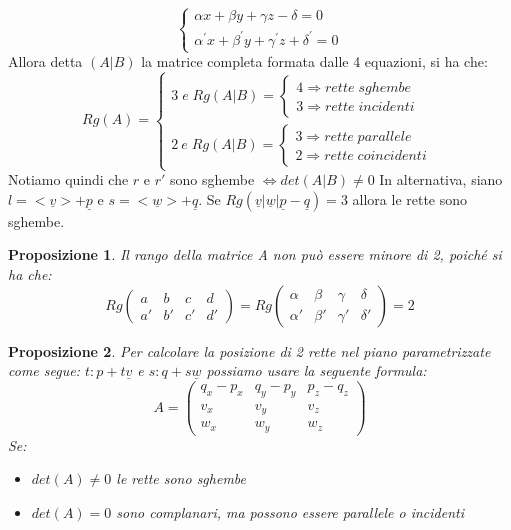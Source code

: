 \documentclass[12pt]{article}
\newenvironment{para}{\begin{adjustwidth}{13mm}{}}{\end{adjustwidth}}
\newtheorem{Proposizione}{Proposizione}[subsection]
\begin{document}
\begin{para}
$$\begin{cases}
    \alpha x+\beta y+\gamma z-\delta = 0 \\
    \alpha^{'}x+\beta^{'}y + \gamma^{'}z+ \delta^{'} = 0
\end{cases}$$
Allora detta $(A|B)$ la matrice completa formata dalle 4 equazioni, si ha che:
$$Rg(A) = \begin{cases}
    3 \; e \; Rg(A|B) = \begin{cases}
        4 \Rightarrow rette \; sghembe \\
        3 \Rightarrow rette \; incidenti
    \end{cases}\\
    2 \: e \; Rg(A|B) = \begin{cases}
        3 \Rightarrow rette \; parallele \\
        2 \Rightarrow rette \; coincidenti
    \end{cases}
\end{cases}$$
Notiamo quindi che $r$ e $r'$ sono sghembe $\Leftrightarrow det(A|B) \neq 0$
In alternativa, siano $l = <\underline{v}> + \underline{p}$ e $s = <\underline{w}> + \underline{q}$. Se $Rg(\underline{v}|\underline{w}|\underline{p}-\underline{q}) = 3$ allora le rette sono sghembe.
\begin{Proposizione}
    Il rango della matrice A non può essere minore di 2, poiché si ha che: $$Rg\begin{pmatrix}
        a & b & c & d \\
        a' & b' & c' & d'
    \end{pmatrix} = Rg\begin{pmatrix}
        \alpha & \beta & \gamma & \delta \\
        \alpha' & \beta' & \gamma' & \delta'
    \end{pmatrix} = 2$$
\end{Proposizione}
\begin{Proposizione}
    Per calcolare la posizione di 2 rette nel piano parametrizzate come segue: $t: p +t\underline{v}$ e $s: q+s\underline{w}$ possiamo usare la seguente formula: $$ A =\begin{pmatrix}
        q_x - p_x & q_y - p_y & p_z - q_z \\
        v_x & v_y & v_z \\
        w_x & w_y & w_z
    \end{pmatrix}$$
Se: \begin{itemize}
    \item $det(A) \neq 0$ le rette sono sghembe
    \item $det(A) = 0$ sono complanari, ma possono essere parallele o incidenti

\end{itemize}
\end{Proposizione}
\end{para}
\end{document}

